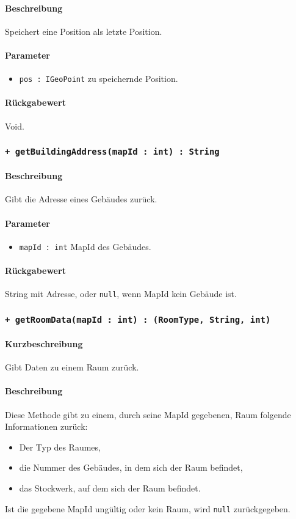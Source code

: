 \paragraph*{Beschreibung}
Speichert eine Position als letzte Position.
\paragraph*{Parameter}
\begin{itemize}
    \item \texttt{pos : IGeoPoint} zu speichernde Position.
\end{itemize}
\paragraph*{Rückgabewert}
Void.

\subsubsection*{\texttt{+ getBuildingAddress(mapId : int) : String}}%
\paragraph*{Beschreibung}
Gibt die Adresse eines Gebäudes zurück.
\paragraph*{Parameter}
\begin{itemize}
    \item \texttt{mapId : int} MapId des Gebäudes.
\end{itemize}
\paragraph*{Rückgabewert}
String mit Adresse, oder \texttt{null}, wenn MapId kein Gebäude ist.

\subsubsection*{\texttt{+ getRoomData(mapId : int) : (RoomType, String, int)}}%
\paragraph*{Kurzbeschreibung}
Gibt Daten zu einem Raum zurück.
\paragraph*{Beschreibung}
Diese Methode gibt zu einem, durch seine MapId gegebenen, Raum folgende Informationen zurück:
\begin{itemize}
    \item Der Typ des Raumes,
    \item die Nummer des Gebäudes, in dem sich der Raum befindet,
    \item das Stockwerk, auf dem sich der Raum befindet.
\end{itemize}
Ist die gegebene MapId ungültig oder kein Raum, wird \texttt{null} zurückgegeben.

